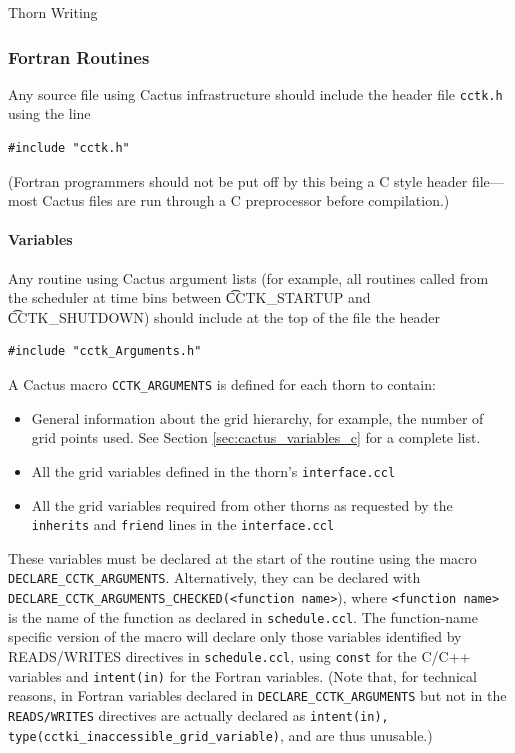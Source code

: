 \begin{cactuspart}{Thorn Writing}
\subsubsection{Fortran Routines}

Any source file using Cactus infrastructure should include
the header file \texttt{cctk.h} using the line
\begin{verbatim}
#include "cctk.h"
\end{verbatim}
(Fortran programmers should not be put off by this being a C style
header file---most Cactus files are run through a C preprocessor
before compilation.)

\paragraph{Variables}

Any routine using Cactus argument lists (for example, all routines called from
the scheduler at time bins between {\t CCTK\_STARTUP} and {\t CCTK\_SHUTDOWN})
should include at the top of the file the header
\begin{verbatim}
#include "cctk_Arguments.h"
\end{verbatim}

A Cactus macro \texttt{CCTK\_ARGUMENTS} is defined for each thorn
to contain:
\begin{itemize}
\item General information about the grid hierarchy, for example, the number
      of grid points used. See Section \ref{sec:cactus_variables_c} for a
      complete list.
\item All the grid variables defined in the thorn's \texttt{interface.ccl}
\item All the grid variables required from other thorns as requested by
      the \texttt{inherits} and \texttt{friend} lines in the \texttt{interface.ccl}
\end{itemize}
These variables must be declared at the start of the routine using
the macro \texttt{DECLARE\_CCTK\_ARGUMENTS}. Alternatively, they can
be declared with \texttt{DECLARE\_CCTK\_ARGUMENTS\_CHECKED(<function name>}),
where \texttt{<function name>} is the name of the function as declared
in \texttt{schedule.ccl}. The function-name specific version of the macro
will declare only those variables identified by READS/WRITES directives
in \texttt{schedule.ccl}, using \texttt{const} for the C/C++ variables
and \texttt{intent(in)} for the Fortran variables. (Note that, for technical
reasons, in Fortran variables declared in \texttt{DECLARE\_CCTK\_ARGUMENTS}
but not in the \texttt{READS/WRITES} directives are actually declared as
\texttt{intent(in), type(cctki\_inaccessible\_grid\_variable)}, and are thus
unusable.)


\end{cactuspart}

